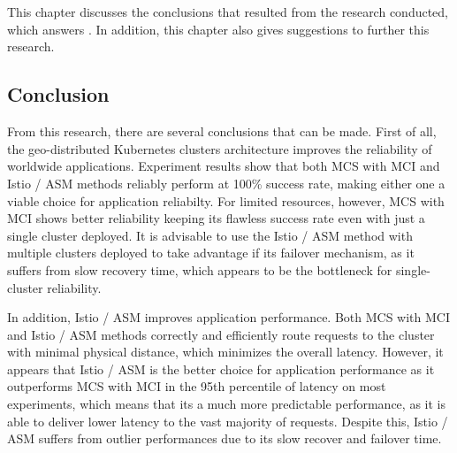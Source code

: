 \chapter{\kesimpulan}
\label{bab:6}
This chapter discusses the conclusions that resulted from the research conducted, which answers . In addition, this chapter also gives suggestions to further this research.


\section{Conclusion}
\label{sec:kesimpulan}

From this research, there are several conclusions that can be made. First of all, the geo-distributed Kubernetes clusters architecture improves the reliability of worldwide applications. Experiment results show that both MCS with MCI and Istio / ASM methods reliably perform at 100\% success rate, making either one a viable choice for application reliabilty. For limited resources, however, MCS with MCI shows better reliability keeping its flawless success rate even with just a single cluster deployed. It is advisable to use the Istio / ASM method with multiple clusters deployed to take advantage if its failover mechanism, as it suffers from slow recovery time, which appears to be the bottleneck for single-cluster reliability.

In addition, Istio / ASM improves application performance. Both MCS with MCI and Istio / ASM methods correctly and efficiently route requests to the cluster with minimal physical distance, which minimizes the overall latency. However, it appears that Istio / ASM is the better choice for application performance as it outperforms MCS with MCI in the 95th percentile of latency on most experiments, which means that its a much more predictable performance, as it is able to deliver lower latency to the vast majority of requests. Despite this, Istio / ASM suffers from outlier performances due to its slow recover and failover time.

